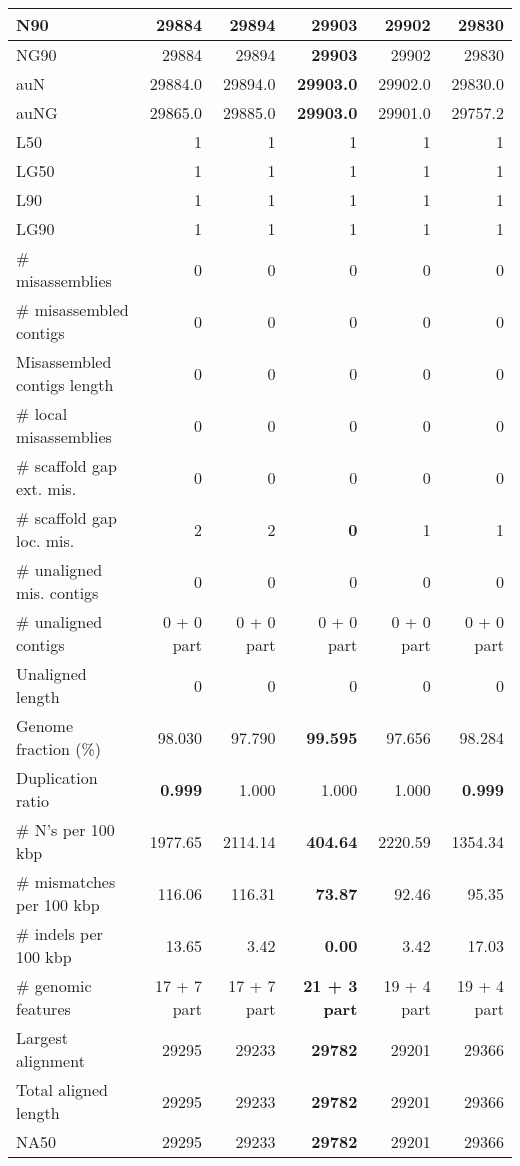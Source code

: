 \documentclass[12pt,a4paper]{article}
\begin{document}
\begin{table}[ht]
\begin{center}
\begin{tabular}{|l*{5}{|r}|}
N90 & 29884 & 29894 & {\bf 29903} & 29902 & 29830 \\ \hline
NG90 & 29884 & 29894 & {\bf 29903} & 29902 & 29830 \\ \hline
auN & 29884.0 & 29894.0 & {\bf 29903.0} & 29902.0 & 29830.0 \\ \hline
auNG & 29865.0 & 29885.0 & {\bf 29903.0} & 29901.0 & 29757.2 \\ \hline
L50 & 1 & 1 & 1 & 1 & 1 \\ \hline
LG50 & 1 & 1 & 1 & 1 & 1 \\ \hline
L90 & 1 & 1 & 1 & 1 & 1 \\ \hline
LG90 & 1 & 1 & 1 & 1 & 1 \\ \hline
\# misassemblies & 0 & 0 & 0 & 0 & 0 \\ \hline
\# misassembled contigs & 0 & 0 & 0 & 0 & 0 \\ \hline
Misassembled contigs length & 0 & 0 & 0 & 0 & 0 \\ \hline
\# local misassemblies & 0 & 0 & 0 & 0 & 0 \\ \hline
\# scaffold gap ext. mis. & 0 & 0 & 0 & 0 & 0 \\ \hline
\# scaffold gap loc. mis. & 2 & 2 & {\bf 0} & 1 & 1 \\ \hline
\# unaligned mis. contigs & 0 & 0 & 0 & 0 & 0 \\ \hline
\# unaligned contigs & 0 + 0 part & 0 + 0 part & 0 + 0 part & 0 + 0 part & 0 + 0 part \\ \hline
Unaligned length & 0 & 0 & 0 & 0 & 0 \\ \hline
Genome fraction (\%) & 98.030 & 97.790 & {\bf 99.595} & 97.656 & 98.284 \\ \hline
Duplication ratio & {\bf 0.999} & 1.000 & 1.000 & 1.000 & {\bf 0.999} \\ \hline
\# N's per 100 kbp & 1977.65 & 2114.14 & {\bf 404.64} & 2220.59 & 1354.34 \\ \hline
\# mismatches per 100 kbp & 116.06 & 116.31 & {\bf 73.87} & 92.46 & 95.35 \\ \hline
\# indels per 100 kbp & 13.65 & 3.42 & {\bf 0.00} & 3.42 & 17.03 \\ \hline
\# genomic features & 17 + 7 part & 17 + 7 part & {\bf 21 + 3 part} & 19 + 4 part & 19 + 4 part \\ \hline
Largest alignment & 29295 & 29233 & {\bf 29782} & 29201 & 29366 \\ \hline
Total aligned length & 29295 & 29233 & {\bf 29782} & 29201 & 29366 \\ \hline
NA50 & 29295 & 29233 & {\bf 29782} & 29201 & 29366 \\ \hline

\end{tabular}
\end{center}
\end{table}
\end{document}
